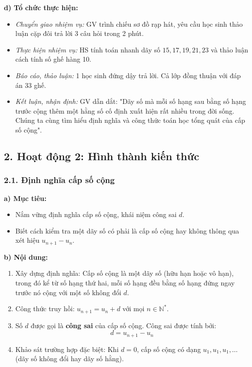\documentclass[12pt, a4paper]{article}
\begin{document}
\noindent \textbf{d) Tổ chức thực hiện:}  
\begin{itemize}[leftmargin=0.8cm]  
    \item \textit{Chuyển giao nhiệm vụ:} GV trình chiếu sơ đồ rạp hát, yêu cầu học sinh thảo luận cặp đôi trả lời 3 câu hỏi trong 2 phút.  
    \item \textit{Thực hiện nhiệm vụ:} HS tính toán nhanh dãy số $15, 17, 19, 21, 23$ và thảo luận cách tính số ghế hàng 10.  
    \item \textit{Báo cáo, thảo luận:} 1 học sinh đứng dậy trả lời. Cả lớp đồng thuận với đáp án 33 ghế.  
    \item \textit{Kết luận, nhận định:} GV dẫn dắt: "Dãy số mà mỗi số hạng sau bằng số hạng trước cộng thêm một hằng số cố định xuất hiện rất nhiều trong đời sống. Chúng ta cùng tìm hiểu định nghĩa và công thức toán học tổng quát của cấp số cộng".  
\end{itemize}  
  
\subsection*{2. Hoạt động 2: Hình thành kiến thức}  
  
\subsubsection*{2.1. Định nghĩa cấp số cộng}  
  
\noindent \textbf{a) Mục tiêu:}  
\begin{itemize}[leftmargin=0.8cm]  
    \item Nắm vững định nghĩa cấp số cộng, khái niệm công sai $d$.  
    \item Biết cách kiểm tra một dãy số có phải là cấp số cộng hay không thông qua xét hiệu $u_{n+1} - u_n$.  
\end{itemize}  
  
\noindent \textbf{b) Nội dung:}  
\begin{enumerate}[leftmargin=0.6cm]  
    \item Xây dựng định nghĩa: Cấp số cộng là một dãy số (hữu hạn hoặc vô hạn), trong đó kể từ số hạng thứ hai, mỗi số hạng đều bằng số hạng đứng ngay trước nó cộng với một số không đổi $d$.  
    \item Công thức truy hồi: $u_{n+1} = u_n + d$ với mọi $n \in \mathbb{N}^*$.  
    \item Số $d$ được gọi là \textbf{công sai} của cấp số cộng. Công sai được tính bởi:  
    $$d = u_{n+1} - u_n$$  
    \item Khảo sát trường hợp đặc biệt: Khi $d = 0$, cấp số cộng có dạng $u_1, u_1, u_1, \dots$ (dãy số không đổi hay dãy số hằng).  
\end{enumerate}  
  
\end{document}
